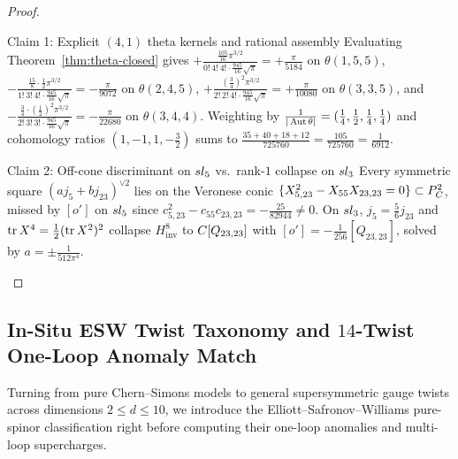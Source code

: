 \begin{proof}\leavevmode
\begin{proofpart}{Claim 1: Explicit $(4,1)$ theta kernels and rational assembly}
Evaluating Theorem~\ref{thm:theta-closed} gives $+\frac{\frac{105}{16}\pi^{3/2}}{0!\,4!\,4!\cdot\frac{945}{16}\sqrt{\pi}} = +\frac{\pi}{5184}$ on $\theta(1,5,5)$, $-\frac{\frac{15}{8}\cdot\frac{1}{2}\pi^{3/2}}{1!\,3!\,4!\cdot\frac{945}{16}\sqrt{\pi}} = -\frac{\pi}{9072}$ on $\theta(2,4,5)$, $+\frac{(\frac{3}{4})^2\pi^{3/2}}{2!\,2!\,4!\cdot\frac{945}{16}\sqrt{\pi}} = +\frac{\pi}{10080}$ on $\theta(3,3,5)$, and $-\frac{\frac{3}{4}\cdot(\frac{1}{2})^2\pi^{3/2}}{2!\,3!\,3!\cdot\frac{945}{16}\sqrt{\pi}} = -\frac{\pi}{22680}$ on $\theta(3,4,4)$. Weighting by $\frac{1}{|\operatorname{Aut}\theta|} = (\frac{1}{4},\frac{1}{2},\frac{1}{4},\frac{1}{4})$ and cohomology ratios $(1,-1,1,-\frac{3}{2})$ sums to $\frac{35 + 40 + 18 + 12}{725760} = \frac{105}{725760} = \frac{1}{6912}$.
\end{proofpart}
\begin{proofpart}{Claim 2: Off-cone discriminant on $sl_5$ vs.\ rank-$1$ collapse on $sl_3$}
Every symmetric square $(a j_5 + b j_{23})^{\vee 2}$ lies on the Veronese conic $\{X_{5,23}^2 - X_{55}X_{23,23} = 0\} \subset P^2_{C}$, missed by $[o']$ on $sl_5$ since $c_{5,23}^2 - c_{55}c_{23,23} = -\frac{25}{82944} \neq 0$. On $sl_3$, $j_5 = \frac{5}{6}j_{23}$ and $\operatorname{tr} X^4 = \frac{1}{2}(\operatorname{tr} X^2)^2$ collapse $H^8_{\mathrm{inv}}$ to $C[Q_{23,23}]$ with $[o'] = -\frac{1}{256}[Q_{23,23}]$, solved by $a = \pm\frac{1}{512\pi^4}$.
\end{proofpart}
\end{proof}

\subsection{In-Situ ESW Twist Taxonomy and \texorpdfstring{$14$}{14}-Twist One-Loop Anomaly Match}
\label{subsec:esw-taxonomy}

Turning from pure Chern--Simons models to general supersymmetric gauge twists across dimensions $2 \le d \le 10$, we introduce the Elliott--Safronov--Williams pure-spinor classification right before computing their one-loop anomalies and multi-loop supercharges.


